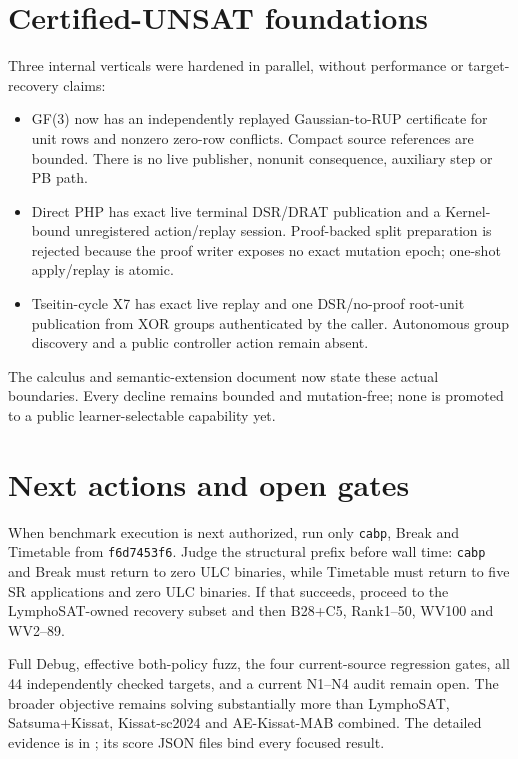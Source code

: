 \documentclass[11pt]{article}
\begin{document}
\section*{Certified-UNSAT foundations}

Three internal verticals were hardened in parallel, without performance or
target-recovery claims:

\begin{itemize}
\item GF(3) now has an independently replayed Gaussian-to-RUP certificate for
unit rows and nonzero zero-row conflicts. Compact source references are bounded.
There is no live publisher, nonunit consequence, auxiliary step or PB path.
\item Direct PHP has exact live terminal DSR/DRAT publication and a Kernel-bound
unregistered action/replay session. Proof-backed split preparation is rejected
because the proof writer exposes no exact mutation epoch; one-shot apply/replay
is atomic.
\item Tseitin-cycle X7 has exact live replay and one DSR/no-proof root-unit
publication from XOR groups authenticated by the caller. Autonomous group discovery
and a public controller action remain absent.
\end{itemize}

The calculus and semantic-extension document now state these actual boundaries.
Every decline remains bounded and mutation-free; none is promoted to a public
learner-selectable capability yet.

\section*{Next actions and open gates}

When benchmark execution is next authorized, run only \texttt{cabp}, Break and
Timetable from \texttt{f6d7453f6}. Judge the structural prefix before wall time:
\texttt{cabp} and Break must return to zero ULC binaries, while Timetable must
return to five SR applications and zero ULC binaries. If that succeeds, proceed
to the LymphoSAT-owned recovery subset and then B28+C5, Rank1--50, WV100 and
WV2--89.

Full Debug, effective both-policy fuzz, the four current-source regression
gates, all 44 independently checked targets, and a current N1--N4 audit remain
open. The broader objective remains solving substantially more than LymphoSAT,
Satsuma+Kissat, Kissat-sc2024 and AE-Kissat-MAB combined. The detailed evidence
is in
; its score JSON
files bind every focused result.
\end{document}
